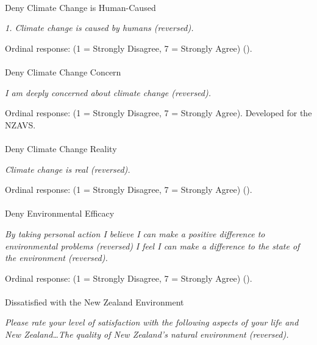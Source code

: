 \documentclass[
  single column]{article}
\makeatletter
\let\oldparagraph\paragraph
\renewcommand{\paragraph}{
    \@ifstar
      \xxxParagraphStar
      \xxxParagraphNoStar
  }
\newcommand{\xxxParagraphStar}[1]{\oldparagraph*{#1}\mbox{}}
\newcommand{\xxxParagraphNoStar}[1]{\oldparagraph{#1}\mbox{}}
\makeatother
\begin{document}
\paragraph{Deny Climate Change is
Human-Caused}\label{deny-climate-change-is-human-caused}

\emph{1. Climate change is caused by humans (reversed).}

Ordinal response: (1 = Strongly Disagree, 7 = Strongly Agree)
().

\paragraph{Deny Climate Change
Concern}\label{deny-climate-change-concern}

\emph{I am deeply concerned about climate change (reversed).}

Ordinal response: (1 = Strongly Disagree, 7 = Strongly Agree). Developed
for the NZAVS.

\paragraph{Deny Climate Change
Reality}\label{deny-climate-change-reality}

\emph{Climate change is real (reversed).}

Ordinal response: (1 = Strongly Disagree, 7 = Strongly Agree)
().

\paragraph{Deny Environmental
Efficacy}\label{deny-environmental-efficacy}

\emph{By taking personal action I believe I can make a positive
difference to environmental problems (reversed)} \emph{I feel I can make
a difference to the state of the environment (reversed).}

Ordinal response: (1 = Strongly Disagree, 7 = Strongly Agree)
().

\paragraph{Dissatisfied with the New Zealand
Environment}\label{dissatisfied-with-the-new-zealand-environment}

\emph{Please rate your level of satisfaction with the following aspects
of your life and New Zealand\ldots The quality of New Zealand's natural
environment (reversed).}
\end{document}
